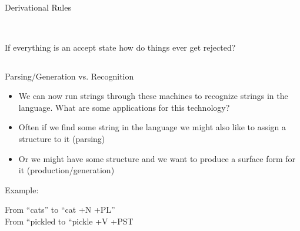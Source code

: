 \documentclass[9pt,xcolor=pdftex,dvipsnames,table]{beamer}
\begin{document}
\subsection{}
\begin{frame}{Derivational Rules}
\begin{center}
	\\
\end{center}

\begin{block}{}
	\begin{center}
	If everything is an accept state how do things ever get rejected?
	\end{center}
\end{block}
\end{frame}

\subsection{}
\begin{frame}{Parsing/Generation vs. Recognition}

\begin{itemize}
	\item We can now run strings through these machines to recognize strings in the language.  What are some applications for this technology?
	\item Often if we find some string in the language we might also like to assign a structure to it (parsing)
	\item Or we might have some structure and we want to produce a surface
   form for it (production/generation)
\end{itemize}
\vspace{.5cm}
{\large Example:}
\vspace{.5cm}

From ``cats'' to ``cat +N +PL''\\
From ``pickled to ``pickle +V +PST

\end{frame}
\end{document}
